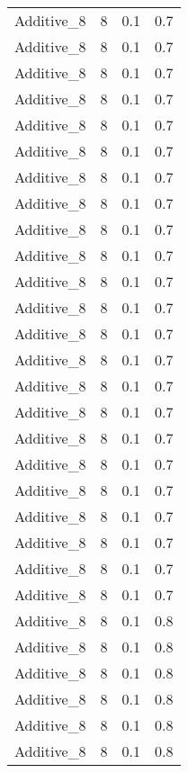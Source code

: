 \documentclass{article}
\begin{document}
\begin{longtable}[H]{lrrr}
 Additive\_8 &       8 &   0.1 &            0.7 \\
 Additive\_8 &       8 &   0.1 &            0.7 \\
 Additive\_8 &       8 &   0.1 &            0.7 \\
 Additive\_8 &       8 &   0.1 &            0.7 \\
 Additive\_8 &       8 &   0.1 &            0.7 \\
 Additive\_8 &       8 &   0.1 &            0.7 \\
 Additive\_8 &       8 &   0.1 &            0.7 \\
 Additive\_8 &       8 &   0.1 &            0.7 \\
 Additive\_8 &       8 &   0.1 &            0.7 \\
 Additive\_8 &       8 &   0.1 &            0.7 \\
 Additive\_8 &       8 &   0.1 &            0.7 \\
 Additive\_8 &       8 &   0.1 &            0.7 \\
 Additive\_8 &       8 &   0.1 &            0.7 \\
 Additive\_8 &       8 &   0.1 &            0.7 \\
 Additive\_8 &       8 &   0.1 &            0.7 \\
 Additive\_8 &       8 &   0.1 &            0.7 \\
 Additive\_8 &       8 &   0.1 &            0.7 \\
 Additive\_8 &       8 &   0.1 &            0.7 \\
 Additive\_8 &       8 &   0.1 &            0.7 \\
 Additive\_8 &       8 &   0.1 &            0.7 \\
 Additive\_8 &       8 &   0.1 &            0.7 \\
 Additive\_8 &       8 &   0.1 &            0.7 \\
 Additive\_8 &       8 &   0.1 &            0.7 \\
 Additive\_8 &       8 &   0.1 &            0.8 \\
 Additive\_8 &       8 &   0.1 &            0.8 \\
 Additive\_8 &       8 &   0.1 &            0.8 \\
 Additive\_8 &       8 &   0.1 &            0.8 \\
 Additive\_8 &       8 &   0.1 &            0.8 \\
 Additive\_8 &       8 &   0.1 &            0.8 \\

\end{longtable}
\end{document}
